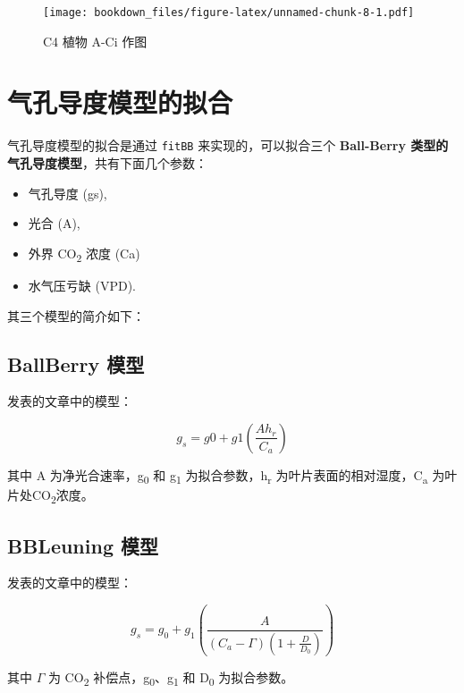 \documentclass[]{krantz}
\providecommand{\tightlist}{%
  \setlength{\itemsep}{0pt}\setlength{\parskip}{0pt}}
\theoremstyle{definition}
\theoremstyle{definition}
\theoremstyle{definition}
\theoremstyle{remark}
\begin{document}
\begin{figure}
\centering
\texttt{[image: bookdown\_files/figure-latex/unnamed-chunk-8-1.pdf]}
\caption{\label{fig:unnamed-chunk-8}C4 植物 A-Ci 作图}
\end{figure}

\cleardoublepage

\chapter{气孔导度模型的拟合}

气孔导度模型的拟合是通过 \texttt{fitBB} 来实现的，可以拟合三个
\textbf{Ball-Berry 类型的气孔导度模型}，共有下面几个参数：

\begin{itemize}
\tightlist
\item
  气孔导度 (gs),
\item
  光合 (A),
\item
  外界 CO\textsubscript{2} 浓度 (Ca)
\item
  水气压亏缺 (VPD).
\end{itemize}

其三个模型的简介如下：

\section{BallBerry 模型}\label{ballberry}

\citet{Ball1987A} 发表的文章中的模型：

\begin{equation}
g_s = g0 + g1(\frac{A h_r}{C_a})
\label{eq:ballberry}
\end{equation}

其中 A 为净光合速率，g\textsubscript{0} 和 g\textsubscript{1}
为拟合参数，h\textsubscript{r} 为叶片表面的相对湿度，C\textsubscript{a}
为叶片处CO\textsubscript{2}浓度。

\section{BBLeuning 模型}\label{bbleuning-}

\citet{leuning1995a} 发表的文章中的模型：

\begin{equation}
g_s = g_0 + g_1(\frac{A}{(C_a - \Gamma)(1 + \frac{D}{D_0})})
\label{eq:BBLeuning}
\end{equation}

其中 \(\Gamma\) 为 CO\textsubscript{2}
补偿点，g\textsubscript{0}、g\textsubscript{1} 和 D\textsubscript{0}
为拟合参数。
\end{document}
